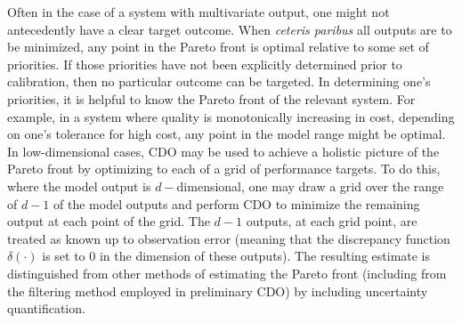 \documentclass[12pt]{article}
\begin{document}
Often in the case of a system with multivariate output, one might not antecedently have a clear target outcome.
%
When \textit{ceteris paribus} all outputs are to be minimized, any point in the Pareto front is optimal relative to some set of priorities.
%
If those priorities have not been explicitly determined prior to calibration, then no particular outcome can be targeted.
%
In determining one's priorities, it is helpful to know the Pareto front of the relevant system.
%
For example, in a system where quality is monotonically increasing in cost, depending on one's tolerance for high cost, any point in the model range might be optimal.
%
%
In low-dimensional cases, CDO may be used to achieve a holistic picture of the Pareto front by optimizing to each of a grid of performance targets.
%
%
%
%
%
To do this, where the model output is $d-$dimensional, one may draw a grid over the range of $d-1$ of the model outputs and perform CDO to minimize the remaining output at each point of the grid.
%
The $d-1$ outputs, at each grid point, are treated as known up to observation error (meaning that the discrepancy function $\delta(\cdot)$ is set to 0 in the dimension of these outputs).
%
The resulting estimate is distinguished from other methods of estimating the Pareto front (including from the filtering method employed in preliminary CDO) by including uncertainty quantification.
%
\end{document}

